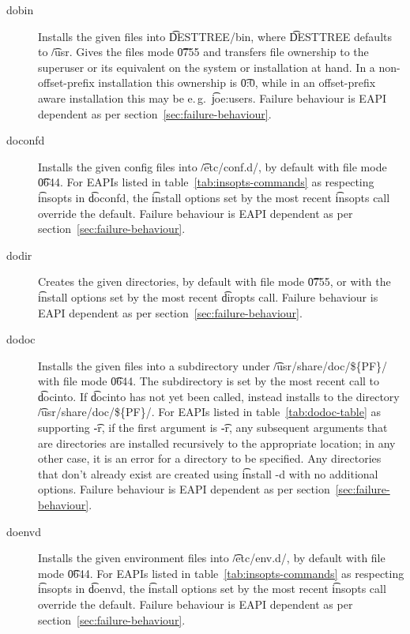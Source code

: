 \begin{description}
\item[dobin] Installs the given files into \t{DESTTREE/bin}, where \t{DESTTREE} defaults to
    \t{/usr}. Gives the files mode \t{0755} and transfers file ownership to the superuser or its
    equivalent on the system or installation at hand. In a non-offset-prefix installation this
    ownership is \t{0:0}, while in an offset-prefix aware installation this may be e.\,g.\
    \t{joe:users}. Failure behaviour is EAPI dependent as per section~\ref{sec:failure-behaviour}.

\item[doconfd] Installs the given config files into \t{/etc/conf.d/}, by default with file mode
    \t{0644}. For EAPIs listed in table~\ref{tab:insopts-commands} as respecting \t{insopts}
    in \t{doconfd}, the \t{install} options set by the most recent \t{insopts} call override
    the default. Failure behaviour is EAPI dependent as per section~\ref{sec:failure-behaviour}.

\item[dodir] Creates the given directories, by default with file mode \t{0755}, or with the
    \t{install} options set by the most recent \t{diropts} call. Failure behaviour is EAPI
    dependent as per section~\ref{sec:failure-behaviour}.

\item[dodoc]  Installs the given files into a subdirectory under
    \t{/usr/share/doc/\$\{PF\}/} with file mode \t{0644}. The subdirectory is set by the most
    recent call to \t{docinto}. If \t{docinto} has not yet been called, instead installs to the
    directory \t{/usr/share/doc/\$\{PF\}/}. For EAPIs listed in table~\ref{tab:dodoc-table}
    as supporting \t{-r}, if the first argument is \t{-r}, any subsequent arguments that are
    directories are installed recursively to the appropriate location; in any other case, it is
    an error for a directory to be specified. Any directories that don't already exist are created
    using \t{install -d} with no additional options. Failure behaviour is EAPI dependent as per
    section~\ref{sec:failure-behaviour}.

\item[doenvd] Installs the given environment files into \t{/etc/env.d/}, by default with file mode
    \t{0644}. For EAPIs listed in table~\ref{tab:insopts-commands} as respecting \t{insopts}
    in \t{doenvd}, the \t{install} options set by the most recent \t{insopts} call override
    the default. Failure behaviour is EAPI dependent as per section~\ref{sec:failure-behaviour}.


\end{description}
